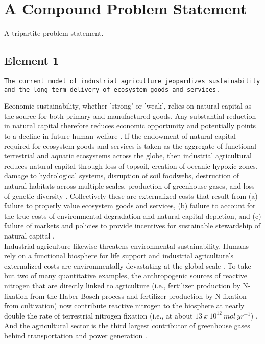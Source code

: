 \section{A Compound Problem Statement}
A tripartite problem statement.

\subsection{Element 1}
\begin{sloppypar}
\noindent \texttt{The current model of industrial agriculture jeopardizes sustainability and the long-term delivery of ecosystem goods and services.}\\
\end{sloppypar}

Economic sustainability, whether 'strong' or 'weak', relies on natural capital as the source for both primary and manufactured goods. Any substantial reduction in natural capital therefore reduces economic opportunity and potentially points to a decline in future human welfare \citep{pearce_blueprint_2000}. If the endowment of natural capital required for ecosystem goods and services is taken as the aggregate of functional terrestrial and aquatic ecosystems across the globe, then industrial agricultural reduces natural capital through loss of topsoil, creation of oceanic hypoxic zones, damage to hydrological systems, disruption of soil foodwebs, destruction of natural habitats across multiple scales, production of greenhouse gases, and loss of genetic diversity \citep{gliessman_agroecology:_2015}. Collectively these are externalized costs that result from (a) failure to properly value ecosystem goods and services, (b) failure to account for the true costs of environmental degradation and natural capital depletion, and (c) failure of markets and policies to provide incentives for sustainable stewardship of natural capital \citep{pearce_blueprint_2000}. \\

Industrial agriculture likewise threatens environmental sustainability. Humans rely on a functional biosphere for life support and industrial agriculture's externalized costs are environmentally devastating at the global scale \citep{tilman_agricultural_2002, wolfe_crop_2000, ceballos_accelerated_2015}. To take but two of many quantitative examples, the anthropogenic sources of reactive nitrogen that are directly linked to agriculture (i.e., fertilizer production by N-fixation from the Haber-Bosch process and fertilizer production by N-fixation from cultivation) now contribute reactive nitrogen to the biosphere at nearly double the rate of terrestrial nitrogen fixation (i.e., at about $13 \ x \ 10^{12} \ mol \ yr^{-1}$) \citep{canfield_evolution_2010}. And the agricultural sector is the third largest contributor of greenhouse gases behind transportation and power generation \citep{gliessman_agroecology:_2015}. \\

